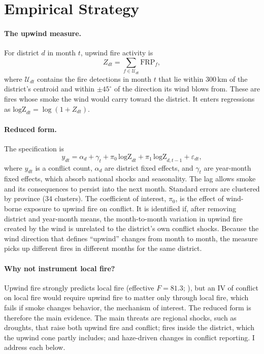 \documentclass[12pt]{article}
\begin{document}
\section{Empirical Strategy}
\label{sec:empirical}

\paragraph{The upwind measure.} For district $d$ in month $t$, upwind fire activity is
\[
Z_{dt} = \sum_{f \in \mathcal{U}_{dt}} \text{FRP}_f,
\]
where $\mathcal{U}_{dt}$ contains the fire detections in month $t$ that lie within 300\,km of the district's centroid and within $\pm 45^{\circ}$ of the direction its wind blows from. These are fires whose smoke the wind would carry toward the district. It enters regressions as $\text{logZ}_{dt} = \log(1+Z_{dt})$.

\paragraph{Reduced form.} The specification is
\begin{equation}
y_{dt} = \alpha_d + \gamma_t + \pi_0\, \text{logZ}_{dt} + \pi_1\, \text{logZ}_{d,t-1} + \varepsilon_{dt},
\label{eq:rf}
\end{equation}
where $y_{dt}$ is a conflict count, $\alpha_d$ are district fixed effects, and $\gamma_t$ are year-month fixed effects, which absorb national shocks and seasonality. The lag allows smoke and its consequences to persist into the next month. Standard errors are clustered by province (34 clusters). The coefficient of interest, $\pi_0$, is the effect of wind-borne exposure to upwind fire on conflict. It is identified if, after removing district and year-month means, the month-to-month variation in upwind fire created by the wind is unrelated to the district's own conflict shocks. Because the wind direction that defines ``upwind'' changes from month to month, the measure picks up different fires in different months for the same district.

\paragraph{Why not instrument local fire?} Upwind fire strongly predicts local fire (effective $F = 81.3$; \citealp{montielolea2013}), but an IV of conflict on local fire would require upwind fire to matter only through local fire, which fails if smoke changes behavior, the mechanism of interest. The reduced form is therefore the main evidence. The main threats are regional shocks, such as droughts, that raise both upwind fire and conflict; fires inside the district, which the upwind cone partly includes; and haze-driven changes in conflict reporting. I address each below.
\end{document}
